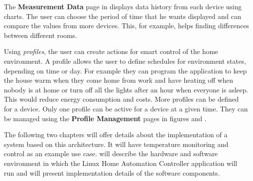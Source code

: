 

The \textbf{Measurement Data} page in  displays data history from each device using charts. The user can choose the period of time that he wants displayed and can compare the values from more devices. This, for example, helps finding differences between different rooms.


Using \textit{profiles}, the user can create actions for smart control of the home environment. A profile allows the user to define schedules for environment states, depending on time or day. For example they can program the application to keep the house warm when they come home from work and have heating off when nobody is at home or turn off all the lights after an hour when everyone is asleep. This would reduce energy consumption and costs. More profiles can be defined for a device. Only one profile can be active for a device at a given time. They can be managed using the \textbf{Profile Management} pages in figures  and .



The following two chapters will offer details about the implementation of a system based on this architecture. It will have temperature monitoring and control as an example use case.  will describe the hardware and software environment in which the Linux Home Automation Controller application will run and  will present implementation details of the software components. 
